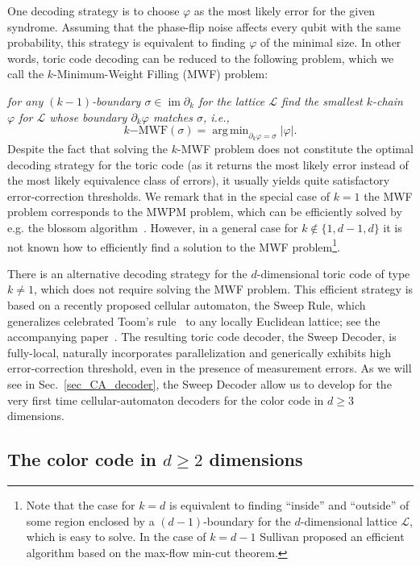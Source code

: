 \documentclass[onecolumn,letterpaper,11pt,accepted=2022-12-19]{quantumarticle}
\DeclareMathOperator*{\argmin}{arg\,min}
\DeclareMathOperator{\im}{im}
\renewcommand{\phi}{\varphi}
\theoremstyle{definition}
\theoremstyle{lemma}
\theoremstyle{theorem}
\theoremstyle{corollary}
\begin{document}
One decoding strategy is to choose $\varphi$ as the most likely error for the given syndrome.
Assuming that the phase-flip noise affects every qubit with the same probability, this strategy is equivalent to finding $\varphi$ of the minimal size.
In other words, toric code decoding can be reduced to the following problem, which we call the $k$-Minimum-Weight Filling (MWF) problem:
{\emph{for any $(k-1)$-boundary $\sigma\in\im \partial_{k}$ for the lattice $\mathcal{L}$ find the smallest $k$-chain $\phi$ for $\mathcal{L}$ whose boundary $\partial_k\phi$ matches $\sigma$, i.e.,}
\begin{equation}
k\mathrm{-MWF}(\sigma) = \argmin_{\partial_{k} \varphi  = \sigma} |\varphi|.
\end{equation}
Despite the fact that solving the $k$-MWF problem does not constitute the optimal decoding strategy for the toric code (as it returns the most likely error instead of the most likely equivalence class of errors), it usually yields quite satisfactory error-correction thresholds.
We remark that in the special case of $k=1$ the MWF problem corresponds to the MWPM problem, which can be efficiently solved by e.g. the blossom algorithm~\cite{Edmonds1965}.
However, in a general case for $k\not\in\{1,d-1,d\}$ it is not known how to efficiently find a solution to the MWF problem\footnote{
Note that the case for $k=d$ is equivalent to finding ``inside'' and ``outside'' of some region enclosed by a $(d-1)$-boundary for the $d$-dimensional lattice $\mathcal{L}$, which is easy to solve.
In the case of $k=d-1$ Sullivan \cite{Sullivan1990} proposed an efficient algorithm based on the max-flow min-cut theorem.}.


There is an alternative decoding strategy for the $d$-dimensional toric code of type $k\neq 1$, which does not require solving the MWF problem. 
This efficient strategy is based on a recently proposed cellular automaton, the Sweep Rule, which generalizes celebrated Toom's rule~\cite{Toom1980,Bennett1985} to any locally Euclidean lattice; see the accompanying paper~\cite{Kubica2018toom}.
The resulting toric code decoder, the Sweep Decoder, is fully-local, naturally incorporates parallelization and generically exhibits high error-correction threshold, even in the presence of measurement errors.
As we will see in Sec.~\ref{sec_CA_decoder}, the Sweep Decoder allow us to develop for the very first time cellular-automaton decoders for the color code in $d\geq 3$ dimensions.



\subsection{The color code in $d\geq 2$ dimensions}
\label{sec_color_code}


}
\end{document}
